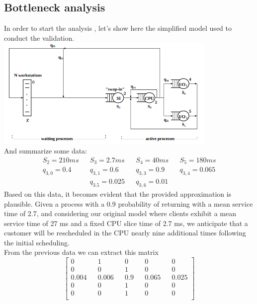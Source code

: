 \documentclass[12pt,a4paper]{article}
\begin{document}
    \subsection{Bottleneck analysis}
    In order to start the analysis , let's show here the simplified model 
    used to conduct the validation.
    \includegraphics[width=0.8\textwidth]{Images/simplified_model.png}
    \\And summarize some data:
    \begin{displaymath}
        \begin{aligned}
        S_2 = 210ms && S_3= 2.7ms && S_4 = 40ms && S_5=180ms\\
        q_{3,0}= 0.4&& q_{3,1}=0.6 && q_{3,3} = 0.9 && q_{3,4}= 0.065\\
        && q_{3.5}= 0.025 && q_{3,6}=0.01 && 
        \end{aligned}
    \end{displaymath}
    Based on this data, it becomes evident that the provided approximation is plausible. Given a process with a 0.9 probability of returning with a mean service time of 2.7, and considering our original model where clients exhibit a mean service time of 27 ms and a fixed CPU slice time of 2.7 ms, we anticipate that a customer will be rescheduled in the CPU nearly nine additional times following the initial scheduling. \\

    From the previous data we can extract this matrix 
    \begin{displaymath}
        \begin{bmatrix}
            0 && 1 && 0 && 0 && 0 \\
            0 && 0 && 1 && 0 && 0 \\
            0.004 && 0.006 && 0.9 && 0.065 && 0.025 \\
            0 && 0 && 1 && 0 && 0 \\
            0 && 0 && 1 && 0 && 0 \\
        \end{bmatrix}
    \end{displaymath}
\end{document}

